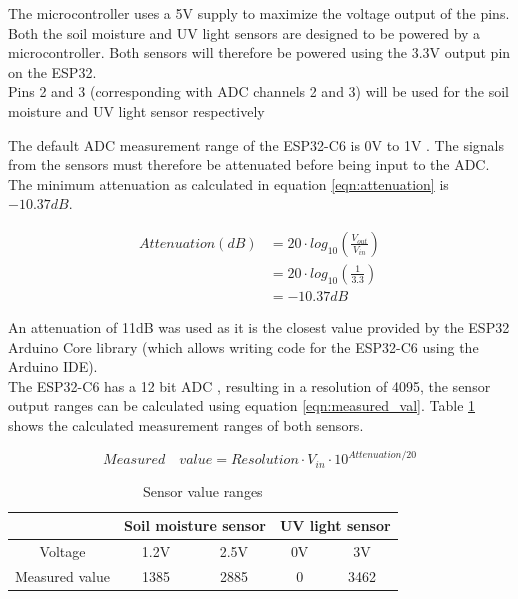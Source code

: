 The microcontroller uses a 5V supply to maximize the voltage output of the pins.
\\


Both the soil moisture and UV light sensors are designed to be powered by a microcontroller. Both sensors will therefore be powered using the 3.3V output pin on the ESP32. 
\\
Pins 2 and 3 (corresponding with ADC channels 2 and 3) will be used for the soil moisture and UV light sensor respectively

The default ADC measurement range of the ESP32-C6 is 0V to 1V \cite{esp_datasheet} \cite{esp_github}. The signals from the sensors must therefore be attenuated before being input to the ADC. The minimum attenuation as calculated in equation \ref{eqn:attenuation} \cite{attenuation_formula} is \(-10.37 dB\).

\begin{equation}
\label{eqn:attenuation}
\begin{split}
    Attenuation  (dB) & = 20 \cdot log_{10}\left ( \frac{V_{out}}{V_{in}} \right ) \\ 
    & = 20 \cdot log_{10}\left ( \frac{1}{3.3} \right ) \\ 
    & = -10.37 dB
\end{split}
\end{equation}

An attenuation of 11dB was used as it is the closest value provided by the ESP32 Arduino Core library \cite{esp_arduino_github} (which allows writing code for the ESP32-C6 using the Arduino IDE). 
\\
The ESP32-C6 has a 12 bit ADC \cite{esp_tech_ref}, resulting in a resolution of 4095, the sensor output ranges can be calculated using equation \ref{eqn:measured_val}. Table \ref{tab:sensor_ranges} shows the calculated measurement ranges of both sensors.

\begin{equation}
\label{eqn:measured_val}
    Measured \quad value = Resolution \cdot V_{in} \cdot 10^{Attenuation / 20}
\end{equation}

\begin{table}[!h]
    \centering
    \begin{tabular}{|c|cc|cc|}
    \hline
         & \multicolumn{2}{c||}{Soil moisture sensor} & \multicolumn{2}{c|}{UV light sensor} \\
        \hline
        Voltage & 1.2V & 2.5V & 0V & 3V \\
        Measured value & 1385 & 2885 & 0 & 3462\\
        \hline
    \end{tabular}
    \caption{Sensor value ranges}
    \label{tab:sensor_ranges}
\end{table}

